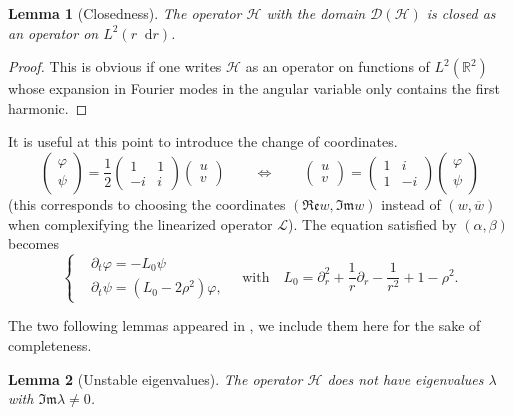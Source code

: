 \documentclass[11 pt]{amsart}
\newtheorem{lem}{Lemma}[section]
\theoremstyle{definition}
\theoremstyle{remark}
\numberwithin{equation}{section}
\newcommand{\dd}{\mathop{}\!\mathrm{d}}
\begin{document}
\begin{lem}[Closedness]
The operator $\mathcal{H}$ with the domain $\mathcal{D}(\mathcal{H})$ is closed as an operator on $L^2(r \dd r)$.
\end{lem}

\begin{proof} This is obvious if one writes $\mathcal{H}$ as an operator on functions of $L^2(\mathbb{R}^2)$ whose expansion in Fourier modes in the angular variable only contains the first harmonic. \end{proof}

It is useful at this point to introduce the change of coordinates.
$$
\begin{pmatrix} \varphi \\ \psi \end{pmatrix} = \frac{1}{2} \begin{pmatrix} 1 & 1 \\ -i & i \end{pmatrix} \begin{pmatrix} u \\ v \end{pmatrix} \qquad \Longleftrightarrow \qquad \begin{pmatrix} u \\ v \end{pmatrix} = \begin{pmatrix} 1 & i \\ 1 & -i \end{pmatrix} \begin{pmatrix} \varphi \\ \psi \end{pmatrix}
$$
(this corresponds to choosing the coordinates $(\mathfrak{Re} w, \mathfrak{Im} w)$ instead of $(w , \overline{w})$ when complexifying the linearized operator $\mathcal{L}$). The equation satisfied by $(\alpha,\beta)$ becomes
$$
\begin{cases}
& \partial_t \varphi = - L_0 \psi \\ 
& \partial_t \psi = (L_0 - 2\rho^2) \varphi, 
\end{cases}
\quad \mbox{with} \quad
L_0 = \partial_r^2 + \frac{1}{r} \partial_r - \frac{1}{r^2} + 1 - \rho^2.
$$

The two following lemmas appeared in \cite{WeinsteinXin}, we include them here for the sake of completeness. 

\begin{lem}[Unstable eigenvalues] \label{lemmadiscrete}
The operator $\mathcal{H}$ does not have eigenvalues $\lambda$ with $\mathfrak{Im} \lambda \neq 0$. 
\end{lem}
\end{document}
